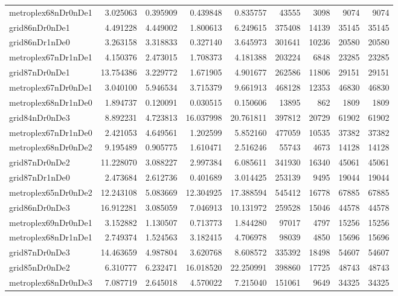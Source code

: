 \begin{longtable}{|l|r|r|r|r|r|r|r|r|}
metroplex68nDr0nDe1 & 3.025063 & 0.395909 & 0.439848 & 0.835757 & 43555 & 3098 & 9074 & 9074 \\
grid86nDr0nDe1 & 4.491228 & 4.449002 & 1.800613 & 6.249615 & 375408 & 14139 & 35145 & 35145 \\
grid86nDr1nDe0 & 3.263158 & 3.318833 & 0.327140 & 3.645973 & 301641 & 10236 & 20580 & 20580 \\
metroplex67nDr1nDe1 & 4.150376 & 2.473015 & 1.708373 & 4.181388 & 203224 & 6848 & 23285 & 23285 \\
grid87nDr0nDe1 & 13.754386 & 3.229772 & 1.671905 & 4.901677 & 262586 & 11806 & 29151 & 29151 \\
metroplex67nDr0nDe1 & 3.040100 & 5.946534 & 3.715379 & 9.661913 & 468128 & 12353 & 46830 & 46830 \\
metroplex68nDr1nDe0 & 1.894737 & 0.120091 & 0.030515 & 0.150606 & 13895 & 862 & 1809 & 1809 \\
grid84nDr0nDe3 & 8.892231 & 4.723813 & 16.037998 & 20.761811 & 397812 & 20729 & 61902 & 61902 \\
metroplex67nDr1nDe0 & 2.421053 & 4.649561 & 1.202599 & 5.852160 & 477059 & 10535 & 37382 & 37382 \\
metroplex68nDr0nDe2 & 9.195489 & 0.905775 & 1.610471 & 2.516246 & 55743 & 4673 & 14128 & 14128 \\
grid87nDr0nDe2 & 11.228070 & 3.088227 & 2.997384 & 6.085611 & 341930 & 16340 & 45061 & 45061 \\
grid87nDr1nDe0 & 2.473684 & 2.612736 & 0.401689 & 3.014425 & 253139 & 9495 & 19044 & 19044 \\
metroplex65nDr0nDe2 & 12.243108 & 5.083669 & 12.304925 & 17.388594 & 545412 & 16778 & 67885 & 67885 \\
grid86nDr0nDe3 & 16.912281 & 3.085059 & 7.046913 & 10.131972 & 259528 & 15046 & 44578 & 44578 \\
metroplex69nDr0nDe1 & 3.152882 & 1.130507 & 0.713773 & 1.844280 & 97017 & 4797 & 15256 & 15256 \\
metroplex68nDr1nDe1 & 2.749374 & 1.524563 & 3.182415 & 4.706978 & 98039 & 4850 & 15696 & 15696 \\
grid87nDr0nDe3 & 14.463659 & 4.987804 & 3.620768 & 8.608572 & 335392 & 18498 & 54607 & 54607 \\
grid85nDr0nDe2 & 6.310777 & 6.232471 & 16.018520 & 22.250991 & 398860 & 17725 & 48743 & 48743 \\
metroplex68nDr0nDe3 & 7.087719 & 2.645018 & 4.570022 & 7.215040 & 151061 & 9649 & 34325 & 34325 \\

\end{longtable}
